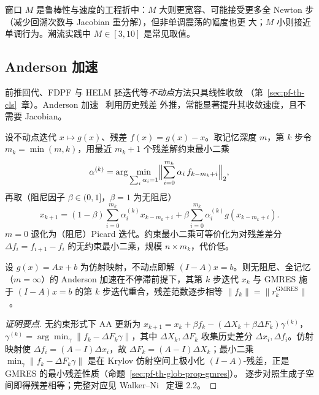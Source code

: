 \begin{remark}\label{sec:pf-th-glob-rem-gll}
窗口 $M$ 是鲁棒性与速度的工程折中：$M$ 大则更宽容、可能接受更多全
Newton 步（减少回溯次数与 Jacobian 重分解），但非单调震荡的幅度也更
大；$M$ 小则接近单调行为。潮流实践中 $M\in[3,10]$ 是常见取值。
\end{remark}

\subsection{Anderson 加速}\label{sec:pf-th-glob-anderson}

前推回代、FDPF 与 HELM 胚迭代等\emph{不动点}方法只具线性收敛
（第~\ref{sec:pf-th-cls}~章）。Anderson 加速~\cite{pfglob-anderson} 利用历史残差
外推，常能显著提升其收敛速度，且不需要 Jacobian。

\begin{definition}[Anderson 加速 AA($m$)]\label{def:pf-th-glob-anderson}
设不动点迭代 $x\mapsto g(x)$、残差 $f(x)=g(x)-x$。取记忆深度 $m$，第 $k$ 步令
$m_k=\min(m,k)$，用最近 $m_k{+}1$ 个残差解约束最小二乘
\begin{equation}
\alpha^{(k)}=\arg\min_{\sum_i\alpha_i=1}
\Bigl\lVert\sum_{i=0}^{m_k}\alpha_i\,f_{k-m_k+i}\Bigr\rVert_2,
\end{equation}
再取（阻尼因子 $\beta\in(0,1]$，$\beta{=}1$ 为无阻尼）
\begin{equation}
x_{k+1}=(1-\beta)\sum_{i=0}^{m_k}\alpha_i^{(k)}x_{k-m_k+i}
+\beta\sum_{i=0}^{m_k}\alpha_i^{(k)}g(x_{k-m_k+i}).
\end{equation}
$m=0$ 退化为（阻尼）Picard 迭代。约束最小二乘可等价化为对残差差分
$\Delta f_i=f_{i+1}-f_i$ 的无约束最小二乘，规模 $n\times m_k$，代价低。
\end{definition}

\begin{theorem}\label{thm:pf-th-glob-anderson-gmres}
设 $g(x)=Ax+b$ 为仿射映射，不动点即解 $(I-A)x=b$。则无阻尼、全记忆（$m=\infty$）的
Anderson 加速在不停滞前提下，其第 $k$ 步迭代 $x_k$ 与 GMRES 施于 $(I-A)x=b$ 的第 $k$
步迭代重合，残差范数逐步相等 $\lVert f_k\rVert=\lVert r_k^{\mathrm{GMRES}}\rVert$
~\cite{pfglob-walkerni}。
\end{theorem}
\begin{proof}[证明要点]
无约束形式下 AA 更新为 $x_{k+1}=x_k+\beta f_k-(\Delta X_k+\beta\Delta F_k)\gamma^{(k)}$，
$\gamma^{(k)}=\arg\min_\gamma\lVert f_k-\Delta F_k\gamma\rVert$，其中
$\Delta X_k,\Delta F_k$ 收集历史差分 $\Delta x_i,\Delta f_i$。仿射映射使
$\Delta f_i=(A-I)\Delta x_i$，故 $\Delta F_k=(A-I)\Delta X_k$；最小二乘
$\min_\gamma\lVert f_k-\Delta F_k\gamma\rVert$ 是在 Krylov 仿射空间上极小化
$(I-A)$-残差，正是 GMRES 的最小残差性质（命题~\ref{sec:pf-th-glob-prop-gmres}）。
逐步对照生成子空间即得残差相等；完整对应见 Walker--Ni~\cite{pfglob-walkerni} 定理 2.2。
\end{proof}

